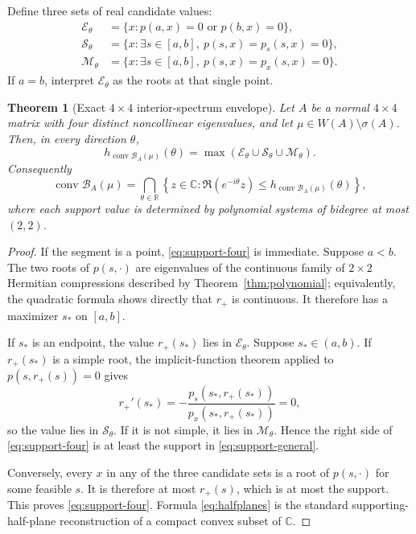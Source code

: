\documentclass[11pt]{article}
\newcommand{\C}{\mathbb C}
\newcommand{\R}{\mathbb R}
\newcommand{\conv}{\operatorname{conv}}
\newcommand{\spec}{\sigma}
\newcommand{\cB}{\mathcal B}
\newcommand{\cE}{\mathcal E}
\newcommand{\cS}{\mathcal S}
\newcommand{\cM}{\mathcal M}
\numberwithin{equation}{section}
\newtheorem{theorem}{Theorem}
\theoremstyle{definition}
\begin{document}
Define three sets of real candidate values:
\begin{align*}
 \cE_\theta&=\{x:p(a,x)=0\text{ or }p(b,x)=0\},\\
 \cS_\theta&=\{x:\exists s\in[a,b],\ p(s,x)=p_s(s,x)=0\},\\
 \cM_\theta&=\{x:\exists s\in[a,b],\ p(s,x)=p_x(s,x)=0\}.
\end{align*}
If $a=b$, interpret $\cE_\theta$ as the roots at that single point.

\begin{theorem}[Exact $4\times4$ interior-spectrum envelope]
\label{thm:four}
Let $A$ be a normal $4\times4$ matrix with four distinct noncollinear
eigenvalues, and let $\mu\in W(A)\setminus\spec(A)$.  Then, in every direction
$\theta$,
\begin{equation}
 h_{\conv\cB_A(\mu)}(\theta)
 =\max(\cE_\theta\cup\cS_\theta\cup\cM_\theta).
 \label{eq:support-four}
\end{equation}
Consequently
\begin{equation}
 \conv\cB_A(\mu)=
 \bigcap_{\theta\in\R}
 \left\{z\in\C:\Re(e^{-i\theta}z)
 \leq h_{\conv\cB_A(\mu)}(\theta)\right\},
 \label{eq:halfplanes}
\end{equation}
where each support value is determined by polynomial systems of bidegree at
most $(2,2)$.
\end{theorem}

\begin{proof}
If the segment is a point, \eqref{eq:support-four} is immediate.  Suppose $a<b$.  The two roots
of $p(s,\cdot)$ are eigenvalues of the continuous family of $2\times2$
Hermitian compressions described by Theorem~\ref{thm:polynomial}; equivalently,
the quadratic formula shows directly that $r_+$ is continuous.  It therefore
has a maximizer $s_*$ on $[a,b]$.

If $s_*$ is an endpoint, the value $r_+(s_*)$ lies in $\cE_\theta$.  Suppose
$s_*\in(a,b)$.  If $r_+(s_*)$ is a simple root, the implicit-function theorem
applied to $p(s,r_+(s))=0$ gives
\[
 r_+'(s_*)=-\frac{p_s(s_*,r_+(s_*))}
                  {p_x(s_*,r_+(s_*))}=0,
\]
so the value lies in $\cS_\theta$.  If it is not simple, it lies in
$\cM_\theta$.  Hence the right side of \eqref{eq:support-four} is at least the
support in \eqref{eq:support-general}.

Conversely, every $x$ in any of the three candidate sets is a root of
$p(s,\cdot)$ for some feasible $s$.  It is therefore at most $r_+(s)$, which
is at most the support.  This proves \eqref{eq:support-four}.  Formula
\eqref{eq:halfplanes} is the standard
supporting-half-plane reconstruction of a compact convex subset of $\C$.
\end{proof}
\end{document}
